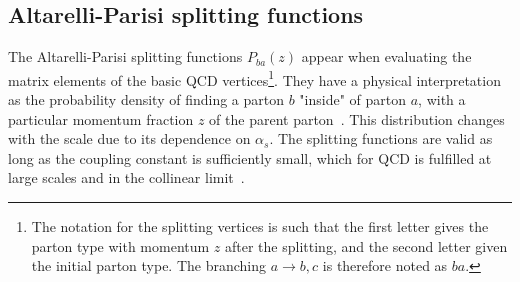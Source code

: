 \documentclass[main.tex]{subfiles}
\begin{document}
\subsection{Altarelli-Parisi splitting functions}\label{sec: derivation_splitting_functions_vacuum}
The Altarelli-Parisi splitting functions \(P_{ba}(z)\) appear when evaluating the matrix elements of the basic QCD vertices\footnote{The notation for the splitting vertices is such that the first letter gives the parton type with momentum \(z\) after the splitting, and the second letter given the initial parton type. The branching \(a\rightarrow b,c\) is therefore noted as \(ba\).}. They have a physical interpretation as the probability density of finding a parton \(b\) "inside" of parton \(a\), with a particular momentum fraction \(z\) of the parent parton~\cite{AltarelliParisi_original}. This distribution changes with the scale due to its dependence on \(\alpha_s\). The splitting functions are valid as long as the coupling constant is sufficiently small, which for QCD is fulfilled at large scales and in the collinear limit~\cite{ellis_stirling_webber_1996}.
\end{document}
